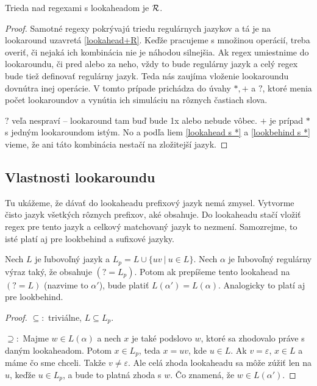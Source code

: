 \begin{veta} \label{reg_uz_la}
Trieda nad regexami s lookaheadom je ${\cal R}$.
\end{veta}
\begin{proof}
Samotné regexy pokrývajú triedu regulárnych jazykov a tá je na lookaround uzavretá \ref{lookahead+R}. Keďže pracujeme s množinou operácií, treba overiť, či nejaká ich kombinácia nie je náhodou silnejšia. Ak regex umiestnime do lookaroundu, či pred alebo za neho, vždy to bude regulárny jazyk a celý regex bude tiež definovať regulárny jazyk. Teda nás zaujíma vloženie lookaroundu dovnútra inej operácie. V tomto prípade prichádza do úvahy $*,+$ a $?$, ktoré menia počet lookaroundov a vynútia ich simuláciu na rôznych častiach slova.

$?$ veľa nespraví -- lookaround tam buď bude 1x alebo nebude vôbec. $+$ je prípad $*$ s jedným lookaroundom istým. No a podľa liem \ref{lookahead s *} a \ref{lookbehind s *} vieme, že ani táto kombinácia nestačí na zložitejší jazyk.
\end{proof}

\subsection{Vlastnosti lookaroundu}

Tu ukážeme, že dávať do lookaheadu prefixový jazyk nemá zmysel. Vytvorme čisto jazyk všetkých rôznych prefixov, aké obsahuje. Do lookaheadu stačí vložiť regex pre tento jazyk a celkový matchovaný jazyk to nezmení. Samozrejme, to isté platí aj pre lookbehind a sufixové jazyky.

\begin{veta}\label{bezprefixove}
Nech $L$ je ľubovoľný jazyk a $L_p = L \cup \lbrace uv ~|~ u \in L \rbrace$. Nech $\alpha$ je ľubovoľný regulárny výraz taký, že obsahuje $(?=L_p)$. Potom ak prepíšeme tento lookahead na $(?=L)$ (nazvime to $\alpha '$), bude platiť $L(\alpha ') = L(\alpha )$. Analogicky to platí aj pre lookbehind.
\end{veta}
\begin{proof}
$\subseteq :$ triviálne,  $L \subseteq L_p$.

$\supseteq :$ Majme $w \in L(\alpha)$ a nech $x$ je také podslovo $w$, ktoré sa zhodovalo práve s daným lookaheadom. Potom $x \in L_p$, teda $x=uv$, kde $u \in L$. Ak $v=\varepsilon$, $x \in L$ a máme čo sme chceli. Takže $v\neq \varepsilon$. Ale celá zhoda lookaheadu sa môže zúžiť len na $u$, keďže $u \in L_p$, a bude to platná zhoda s $w$. Čo znamená, že $w \in L(\alpha ')$.
\end{proof}

